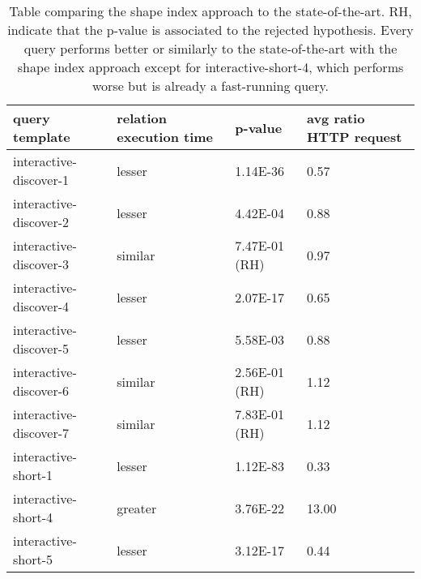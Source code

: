 \begin{table}
	\begin{center}
		\begin{tabular}{|l|l|l|l|}
			\hline
			query template & relation execution time & p-value & avg ratio HTTP request \\
			\hline
			interactive-discover-1 & lesser & 1.14E-36 & 0.57 \\
			\hline
			interactive-discover-2 & lesser & 4.42E-04 & 0.88 \\
			\hline
			interactive-discover-3 & similar & 7.47E-01 (RH) & 0.97 \\
			\hline
			interactive-discover-4 & lesser & 2.07E-17 & 0.65 \\
			\hline
			interactive-discover-5 & lesser & 5.58E-03 & 0.88 \\
			\hline
			interactive-discover-6 & similar & 2.56E-01 (RH) & 1.12 \\
			\hline
			interactive-discover-7 & similar & 7.83E-01 (RH) & 1.12 \\
			\hline
			interactive-short-1 & lesser & 1.12E-83 & 0.33 \\
			\hline
			interactive-short-4 & greater & 3.76E-22 & 13.00 \\
			\hline
			interactive-short-5 & lesser & 3.12E-17 & 0.44 \\
			\hline
		\end{tabular}
	\end{center}
	\caption{Table comparing the shape index approach to the state-of-the-art. RH, indicate that the p-value is associated to the rejected hypothesis. Every query performs better or similarly to the state-of-the-art with the shape index approach except for interactive-short-4, which performs worse but is already a fast-running query.}
	\label{tab:statSignificanceStateOfTheArt}
\end{table}